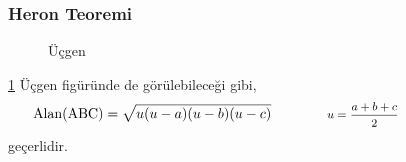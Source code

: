 \subsubsection{Heron Teoremi}
\begin{figure}[h!]
    \centering
    \caption{Üçgen}
    \label{fig:trig}
\end{figure}

\ref{fig:trig} Üçgen figüründe de görülebileceği gibi,
\begin{equation}
    \text{Alan(ABC)} = \sqrt{u(u-a)(u-b)(u-c)} \qquad \qquad \parbox{4cm}{\footnotesize$\begin{aligned}
        u = \frac{a+b+c}{2}
    \end{aligned}$}
\end{equation}
geçerlidir.
